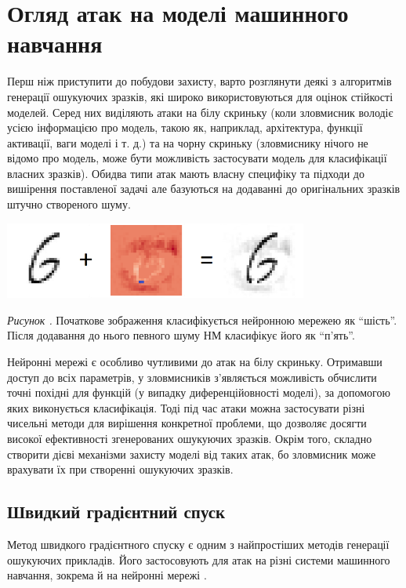 \documentclass[14pt,a4paper]{extarticle}
\newcounter{e}
\newcounter{pic}
\newcommand{\pic}[1]{\refstepcounter{pic} \vspace{-0.3cm}\textit{Рисунок \arabic{pic}\label{#1}.}}
\numberwithin{equation}{section}
\numberwithin{figure}{section}
\begin{document}
 \newpage
 \thispagestyle{empty}
 \section{Огляд атак на моделі машинного навчання}
 
 Перш ніж приступити до побудови захисту, варто розглянути деякі з алгоритмів генерації ошукуючих зразків, які широко використовуються для оцінок стійкості моделей. Серед них виділяють атаки на білу скриньку (коли зловмисник володіє усією інформацією про модель, такою як, наприклад, архітектура, функції активації, ваги моделі і т. д.) та на чорну скриньку (зловмиснику нічого не відомо про модель, може бути можливість застосувати модель для класифікації власних зразків). Обидва типи атак мають власну специфіку та підходи до вишірення поставленої задачі але базуються на додаванні до оригінальних зразків штучно створеного шуму.


 \begin{center}
	\includegraphics[width=10cm]{../images/six.png}
 \end{center}
 \begin{center}
	\pic{six}
	Початкове зображення класифікується нейронною мережею як ``шість''. Після додавання до нього певного шуму НМ класифікує його як ``п'ять''.
 \end{center}

 Нейронні мережі є особливо чутливими до атак на білу скриньку. Отримавши доступ до всіх параметрів, у зловмисників з'являється можливість обчислити точні похідні для функцій (у випадку диференційовності моделі), за допомогою яких виконується класифікація. Тоді під час атаки можна застосувати різні чисельні методи для вирішення конкретної проблеми, що дозволяє досягти високої ефективності згенерованих ошукуючих зразків. Окрім того, складно створити дієві механізми захисту моделі від таких атак, бо зловмисник може врахувати їх при створенні ошукуючих зразків. 

 \subsection{Швидкий градієнтний спуск}

 Метод швидкого градієнтного спуску є одним з найпростіших методів генерації ошукуючих прикладів. Його застосовують для атак на різні системи машинного навчання, зокрема й на нейронні мережі \cite{explaining-a-e}.
\end{document}
